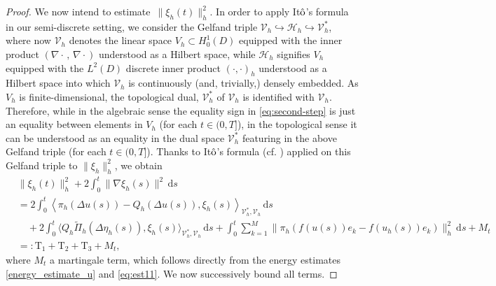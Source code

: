\documentclass[12pt]{article}
\newcommand{\dd}{\,\mathrm{d}}
\begin{document}
{\begin{proof}
\smallskip

 We now intend to estimate~$ \|\xi_h(t)\|^2_h$. In order to apply It$\hat{\rm{o}}$'s formula in our semi-discrete setting, we consider the Gelfand triple $\mathcal{V}_h \hookrightarrow \mathcal{H}_h \hookrightarrow \mathcal{V}_h^*$, where now $\mathcal{V}_h$ denotes the linear space $V_h\subset H^1_0(D)$ equipped with the inner product $(\nabla \cdot\,,\, \nabla \cdot)$ understood as a Hilbert space, while $\mathcal{H}_h$ signifies $V_h$ equipped with the $L^2(D)$ discrete inner product $(\cdot,\cdot)_h$ understood as a Hilbert space into which $\mathcal{V}_h$ is continuously (and, trivially,) densely embedded. As $V_h$ is finite-dimensional, the topological dual, $\mathcal{V}_h^*$ of $\mathcal{V}_h$ is identified with $\mathcal{V}_h$. Therefore, while in the algebraic sense the equality sign in \eqref{eq:second-step} is just an equality between elements in $V_h$ (for each $t \in (0,T]$), in the topological sense it can
be understood as an equality in the dual space $\mathcal{V}_h^*$ featuring in the above Gelfand triple
(for each $t \in (0,T]$). Thanks to It$\hat{\rm o}$'s formula (cf. \cite{Krylov,MR651582})  applied on this Gelfand triple to $\|\xi_h\|_h^2$, we obtain
%
\begin{align}
\label{eq:T1234}
&    \|\xi_h(t)\|^2_h + 2 \int_0^t \| \nabla \xi_h(s)\|^2 \dd s \nonumber\\&= 2 \int_0^t \left\langle \pi_h(\Delta u(s)) - Q_h (\Delta u(s)),\xi_h(s)\right\rangle_{\mathcal{V}_h^*,\mathcal{V}_h}\!\!\dd s \nonumber\\
    &\quad + 2 \int_0^t \langle Q_h \tilde{\Pi}_h(\Delta \eta_h(s)),\xi_h(s)\rangle_{\mathcal{V}_h^*, \mathcal{V}_h} \!\dd s+ \int_0^t \sum_{k=1}^M\|\pi_h(f(u(s))e_k - f(u_h(s))e_k)\|^2_h \dd s + M_t \nonumber\\
    & =: \mathrm{T}_1 + \mathrm{T}_2 + \mathrm{T}_3 + M_t,
\end{align}
%
where $M_t$ a martingale term, which follows directly from the energy estimates \eqref{energy_estimate_u} and \eqref{eq:est11}. We now successively bound all terms.



\end{proof}}
\end{document}
